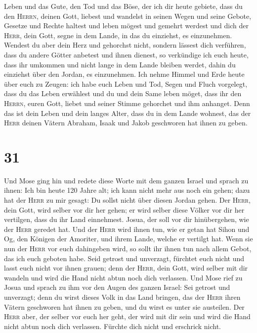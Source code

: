 Leben und das Gute, den Tod und das Böse,  der ich dir
heute gebiete, dass du den \textsc{Herrn}, deinen Gott, liebest und
wandelst in seinen Wegen und seine Gebote, Gesetze und Rechte haltest
und leben mögest und gemehrt werdest und dich der \textsc{Herr}, dein
Gott, segne in dem Lande, in das du einziehst, es einzunehmen.
 Wendest du aber dein Herz und gehorchst nicht, sondern
lässest dich verführen, dass du andere Götter anbetest und ihnen
dienest,  so verkündige ich euch heute, dass ihr umkommen
und nicht lange in dem Lande bleiben werdet, dahin du einziehst über den
Jordan, es einzunehmen.  Ich nehme Himmel und Erde heute
über euch zu Zeugen: ich habe euch Leben und Tod, Segen und Fluch
vorgelegt, dass du das Leben erwählest und du und dein Same leben möget,
 dass ihr den \textsc{Herrn}, euren Gott, liebet und
seiner Stimme gehorchet und ihm anhanget. Denn das ist dein Leben und
dein langes Alter, dass du in dem Lande wohnest, das der \textsc{Herr}
deinen Vätern Abraham, Isaak und Jakob geschworen hat ihnen zu geben.

\hypertarget{section-30}{%
\section{31}\label{section-30}}

 Und Mose ging hin und redete diese Worte mit dem ganzen
Israel  und sprach zu ihnen: Ich bin heute 120 Jahre alt;
ich kann nicht mehr aus noch ein gehen; dazu hat der \textsc{Herr} zu
mir gesagt: Du sollst nicht über diesen Jordan gehen.  Der
\textsc{Herr}, dein Gott, wird selber vor dir her gehen; er wird selber
diese Völker vor dir her vertilgen, dass du ihr Land einnehmest. Josua,
der soll vor dir hinübergehen, wie der \textsc{Herr} geredet hat.
 Und der \textsc{Herr} wird ihnen tun, wie er getan hat
Sihon und Og, den Königen der Amoriter, und ihrem Lande, welche er
vertilgt hat.  Wenn sie nun der \textsc{Herr} vor euch
dahingeben wird, so sollt ihr ihnen tun nach allem Gebot, das ich euch
geboten habe.  Seid getrost und unverzagt, fürchtet euch
nicht und lasst euch nicht vor ihnen grauen; denn der \textsc{Herr},
dein Gott, wird selber mit dir wandeln und wird die Hand nicht abtun
noch dich verlassen.  Und Mose rief zu Josua und sprach zu
ihm vor den Augen des ganzen Israel: Sei getrost und unverzagt; denn du
wirst dieses Volk in das Land bringen, das der \textsc{Herr} ihren
Vätern geschworen hat ihnen zu geben, und du wirst es unter sie
austeilen.  Der \textsc{Herr} aber, der selber vor euch
her geht, der wird mit dir sein und wird die Hand nicht abtun noch dich
verlassen. Fürchte dich nicht und erschrick nicht.

